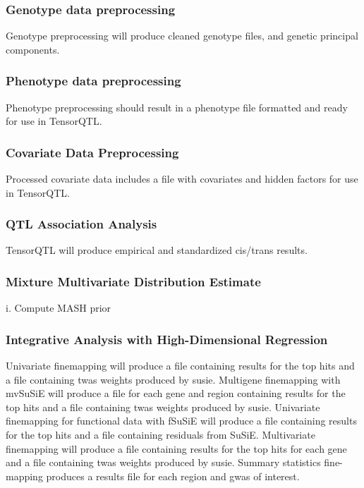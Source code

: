 \documentclass[12pt]{article}
\begin{document}
\subsubsection*{Genotype data preprocessing}

Genotype preprocessing will produce cleaned genotype files, and genetic principal components.

\subsubsection*{Phenotype data preprocessing}

Phenotype preprocessing should result in a phenotype file formatted and ready for use in TensorQTL.

\subsubsection*{Covariate Data Preprocessing}

Processed covariate data includes a file with covariates and hidden factors for use in TensorQTL.

\subsubsection*{QTL Association Analysis}

TensorQTL will produce empirical and standardized cis/trans results.

\subsubsection*{Mixture Multivariate Distribution Estimate}

i. Compute MASH prior


\subsubsection*{Integrative Analysis with High-Dimensional Regression}

Univariate finemapping will produce a file containing results for the top hits and a file containing twas weights produced by susie. Multigene finemapping with mvSuSiE will produce a file for each gene and region containing results for the top hits and a file containing twas weights produced by susie. Univariate finemapping for functional data with fSuSiE will produce a file containing results for the top hits and a file containing residuals from SuSiE. Multivariate finemapping will produce a file containing results for the top hits for each gene and a file containing twas weights produced by susie. Summary statistics fine-mapping produces a results file for each region and gwas of interest.
\end{document}
